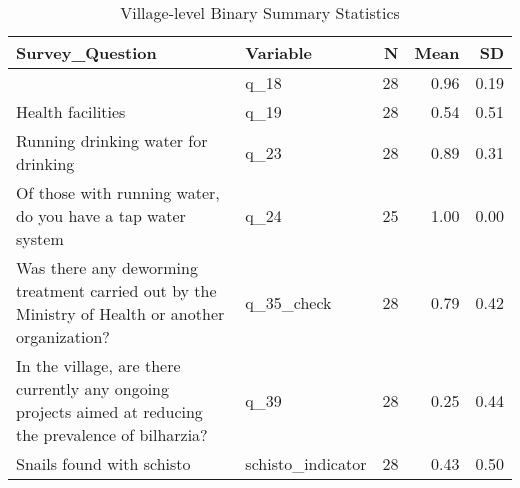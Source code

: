 \begin{table}[!t]
\caption*{
{\large Village-level Binary Summary Statistics}
} 
\fontsize{12.0pt}{14.4pt}\selectfont
\begin{tabular*}{\linewidth}{@{\extracolsep{\fill}}llrrr}
\toprule
Survey\_Question & Variable & N & Mean & SD \\ 
\midrule\addlinespace[2.5pt]
{Educational facilities} & {q\_18} & {28} & {0.96} & {0.19} \\ 
{Health facilities} & {q\_19} & {28} & {0.54} & {0.51} \\ 
{Running drinking water for drinking} & {q\_23} & {28} & {0.89} & {0.31} \\ 
{Of those with running water, do you have a tap water system} & {q\_24} & {25} & {1.00} & {0.00} \\ 
{Was there any deworming treatment carried out by the Ministry of Health or another organization?} & {q\_35\_check} & {28} & {0.79} & {0.42} \\ 
{In the village, are there currently any ongoing projects aimed at reducing the prevalence of bilharzia?} & {q\_39} & {28} & {0.25} & {0.44} \\ 
{Snails found with schisto} & {schisto\_indicator} & {28} & {0.43} & {0.50} \\ 
\bottomrule
\end{tabular*}
\end{table}

